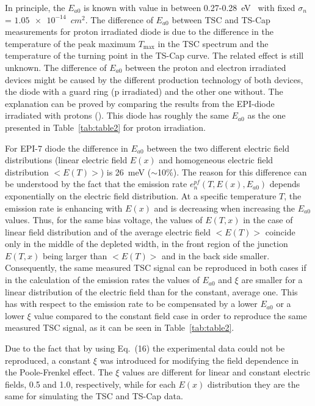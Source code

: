 \documentclass[final, 5p, times]{elsarticle}
\begin{document}
\par
In principle, the $E_{a0}$ is known with value in between 0.27-0.28~eV~\cite{b27} with fixed $\sigma_n$ = $\num{1.05e-14}$~$\si{cm^2}$. The difference of $E_{a0}$ between TSC and TS-Cap measurements for proton irradiated diode is due to the difference in the temperature of the peak maximum $T_\text{max}$ in the TSC spectrum and the temperature of the turning point in the TS-Cap curve. The related effect is still unknown. The difference of $E_{a0}$ between the proton and electron irradiated devices might be caused by the different production technology of both devices, the diode with a guard ring (p irradiated) and the other one without. The explanation can be proved by comparing the results from the EPI-diode irradiated with protons (\cite{b27}). This diode has roughly the same $E_{a0}$ as the one presented in Table~\ref{tab:table2} for proton irradiation.  
\par
For EPI-7 diode the difference in $E_{a0}$ between the two different electric field distributions (linear electric field $E(x)$ and homogeneous electric field distribution $<E(T)>$) is 26~meV ($\sim$10\%). The reason for this difference can be understood by the fact that the emission rate $e^{pf}_{n} (T, E(x), E_{a0})$ depends exponentially on the electric field distribution. At a specific temperature $T$, the emission rate is enhancing with $E(x)$ and is decreasing when increasing the $E_{a0}$ values. Thus, for the same bias voltage, the values of $E(T,x)$ in the case of linear field distribution and of the average electric field $<E(T)>$ coincide only in the middle of the depleted width, in the front region of the junction $E(T,x)$ being larger than $<E(T)>$ and in the back side smaller. Consequently, the same measured TSC signal can be reproduced in both cases if in the calculation of the emission rates the values of $E_{a0}$ and $\xi$ are smaller for a linear distribution of the electric field than for the constant, average one. This has with respect to the emission rate to be compensated by a lower $E_{a0}$ or a lower $\xi$ value compared to the constant field case in order to reproduce the same measured TSC signal, as it can be seen in Table~\ref{tab:table2}.
\par
Due to the fact that by using Eq.~(16) the experimental data could not be reproduced, a constant $\xi$ was introduced for modifying the field dependence in the Poole-Frenkel effect. The $\xi$ values are different for linear and constant electric fields, 0.5 and 1.0, respectively, while for each $E(x)$ distribution they are the same for simulating the TSC and TS-Cap data. 
\par
\end{document}
